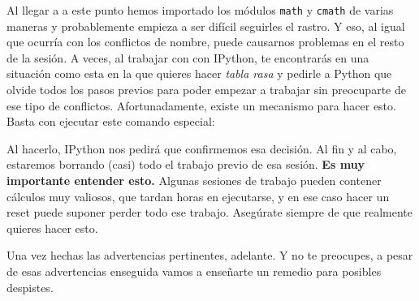 \documentclass[10pt,a4paper]{article}\usepackage[]{graphicx}\usepackage[]{color}
\makeatletter
\newenvironment{kframe}{%
 \def\at@end@of@kframe{}%
 \ifinner\ifhmode%
  \def\at@end@of@kframe{\end{minipage}}%
  \begin{minipage}{\columnwidth}%
 \fi\fi%
 \def\FrameCommand##1{\hskip\@totalleftmargin \hskip-\fboxsep
 \colorbox{shadecolor}{##1}\hskip-\fboxsep
     \hskip-\linewidth \hskip-\@totalleftmargin \hskip\columnwidth}%
 \MakeFramed {\advance\hsize-\width
   \@totalleftmargin\z@ \linewidth\hsize
   \@setminipage}}%
 {\par\unskip\endMakeFramed%
 \at@end@of@kframe}
\newenvironment{knitrout}{}{} %
\newcounter {cont01}
\makeatother
\begin{document}
Al llegar a a este punto hemos importado los módulos {\tt math} y {\tt cmath} de varias maneras y probablemente empieza a ser difícil seguirles el rastro. Y eso, al igual que ocurría con los conflictos de nombre, puede causarnos problemas en el resto de la sesión. A veces, al trabajar con con IPython, te encontrarás en una situación como esta en la que quieres hacer {\em tabla rasa} y pedirle a Python que olvide todos los pasos previos para poder empezar a trabajar sin preocuparte de ese tipo de conflictos. Afortunadamente, existe un mecanismo para hacer esto. Basta con ejecutar este comando especial:
\begin{knitrout}
\color{fgcolor}\begin{kframe}
\begin{alltt}
\end{alltt}
\end{kframe}
\end{knitrout}
Al hacerlo, IPython nos pedirá que confirmemos esa decisión. Al fin y al cabo, estaremos borrando (casi) todo el trabajo previo de esa sesión. {\bf Es muy importante entender esto.} Algunas sesiones de trabajo pueden contener cálculos muy valiosos, que tardan horas en ejecutarse, y en ese caso hacer un reset puede suponer perder todo ese trabajo. Asegúrate siempre de que realmente quieres hacer esto.  

Una vez hechas las advertencias pertinentes, adelante. Y no te preocupes, a pesar de esas advertencias enseguida vamos a enseñarte un remedio para posibles despistes.
\end{document}

